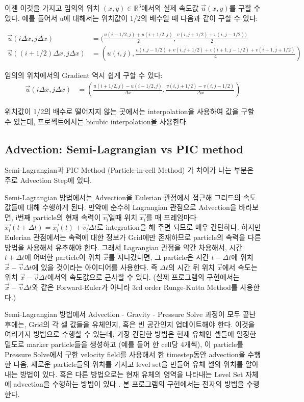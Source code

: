 \documentclass[12pt, A4]{article}
\begin{document}
이젠 이것을 가지고 임의의 위치 $(x, y) \in \mathbb{R}^3$에서의 실제 속도값 $\vec{u}(x, y)$를 구할 수 있다. 예를 들어서 u에 대해서는 위치값이 1/2의 배수일 때 다음과 같이 구할 수 있다:

\begin{align*} 
  \vec{u}(i \Delta x, j \Delta x) &= (\frac{u(i-1/2, j) + u(i+1/2, j)}{2}, \frac{v(i,j+1/2) + v(i,j-1/2))}{2} \\
  \vec{u}((i+1/2) \Delta x, j \Delta x) &= (u(i,j), \frac{v(i,j-1/2) + v(i,j+1/2) + v(i+1,j-1/2) + v(i+1,j+1/2)}{4})
\end{align*}

임의의 위치에서의 Gradient 역시 쉽게 구할 수 있다:
\begin{align*}
  \vec{u}(i \Delta x, j \Delta x) &= (\frac{u(i+1/2, j) - u(i-1/2, j)}{\Delta x}, \frac{v(i,j+1/2) - v(i,j-1/2)}{\Delta x})
\end{align*}

위치값이 1/2의 배수로 떨어지지 않는 곳에서는 interpolation을 사용하여 값을 구할 수 있는데, 프로젝트에서는 bicubic interpolation을 사용한다.

\subsection{Advection: Semi-Lagrangian vs PIC method}

Semi-Lagrangian과 PIC Method (Particle-in-cell Method) 가 차이가 나는 부분은 주로 Advection Step에 있다. 

Semi-Lagrangian 방법에서는 Advection을 Eulerian 관점에서 접근해 그리드의 속도 값들에 대해 수행하게 된다. 만약에 순수히 Lagrangian 관점으로 Advection을 바라보면, i번째 particle의 현재 속력이 $\vec{v_i}$일때 위치 $\vec{x_i}$를 매 프레임마다 $\vec{x_i}(t + \Delta t) = \vec{x_i}(t) + \vec{v_i} \Delta t$로 integration을 해 주면 되므로 매우 간단하다. 하지만 Eulerian 관점에서는 속력에 대한 정보가 Grid에만 존재하므로 particle의 속력을 다른 방법을 사용해서 유추해야 한다. 그래서 Lagrangian 관점을 약간 차용해서, 시간 $t + \Delta t$에 어떠한 particle이 위치 $\vec{x}$를 지나갔다면, 그 particle은 시간 $t - \Delta t$에 위치 $\vec{x} - \vec{v} \Delta t$에 있을 것이라는 아이디어를 사용한다. 즉 $\Delta t$의 시간 뒤 위치 $\vec{x}$에서 속도는 위치 $\vec{x} - \vec{v} \Delta t$에서의 속도값으로 근사할 수 있다. (실제 프로그램의 구현에서는 $\vec{x} - \vec{v} \Delta t$와 같은 Forward-Euler가 아니라 3rd order Runge-Kutta Method를 사용한다.) \cite[p.29-33]{fluid-sim-cg}

Semi-Lagrangian 방법에서 Advection - Gravity - Pressure Solve 과정이 모두 끝난 후에는, Grid의 각 셀 값들을 유체인지, 혹은 빈 공간인지 업데이트해야 한다. 이것을 여러가지 방법으로 수행할 수 있는데, 가장 간단한 방법은 현재 유체인 셀들에 일정한 밀도로 marker particle들을 생성하고 (예를 들어 한 cell당 4개씩), 이 particle를 Pressure Solve에서 구한 velocity field를 사용해서 한 timestep동안 advection을 수행한 다음, 새로운 particle들의 위치를 가지고 level set을 만들어 유체 셀의 위치를 알아내는 방법이 있다. 혹은 다른 방법으로는 현재 유체의 영역을 나타내는 Level Set 자체에 advection을 수행하는 방법이 있다 \cite[p.57]{fluid-sim-cg}. 본 프로그램의 구현에서는 전자의 방법을 수행한다.
\end{document}
